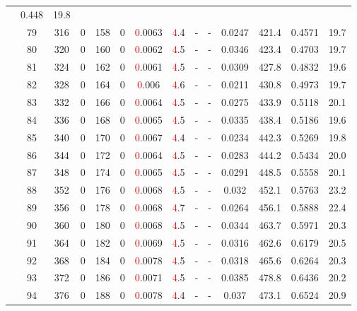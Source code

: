 \begin{table}[htb]
{\begin{tabular}{|c|c|c|c|c|c|c|c|c|c|c|c|c|c|}
 & 0.448 & 19.8
 \\
 & 
79 & 316 & 0 & 158 & 0
 & \textcolor{red}0.0063 & \textcolor{red}4.4
 & - & -
 & 0.0247 & 421.4
 & 0.4571 & 19.7
 \\
 & 
80 & 320 & 0 & 160 & 0
 & \textcolor{red}0.0062 & \textcolor{red}4.5
 & - & -
 & 0.0346 & 423.4
 & 0.4703 & 19.7
 \\
 & 
81 & 324 & 0 & 162 & 0
 & \textcolor{red}0.0061 & \textcolor{red}4.5
 & - & -
 & 0.0309 & 427.8
 & 0.4832 & 19.6
 \\
 & 
82 & 328 & 0 & 164 & 0
 & \textcolor{red}0.006 & \textcolor{red}4.6
 & - & -
 & 0.0211 & 430.8
 & 0.4973 & 19.7
 \\
 & 
83 & 332 & 0 & 166 & 0
 & \textcolor{red}0.0064 & \textcolor{red}4.5
 & - & -
 & 0.0275 & 433.9
 & 0.5118 & 20.1
 \\
 & 
84 & 336 & 0 & 168 & 0
 & \textcolor{red}0.0065 & \textcolor{red}4.5
 & - & -
 & 0.0335 & 438.4
 & 0.5186 & 19.6
 \\
 & 
85 & 340 & 0 & 170 & 0
 & \textcolor{red}0.0067 & \textcolor{red}4.4
 & - & -
 & 0.0234 & 442.3
 & 0.5269 & 19.8
 \\
 & 
86 & 344 & 0 & 172 & 0
 & \textcolor{red}0.0064 & \textcolor{red}4.5
 & - & -
 & 0.0283 & 444.2
 & 0.5434 & 20.0
 \\
 & 
87 & 348 & 0 & 174 & 0
 & \textcolor{red}0.0065 & \textcolor{red}4.5
 & - & -
 & 0.0291 & 448.5
 & 0.5558 & 20.1
 \\
 & 
88 & 352 & 0 & 176 & 0
 & \textcolor{red}0.0068 & \textcolor{red}4.5
 & - & -
 & 0.032 & 452.1
 & 0.5763 & 23.2
 \\
 & 
89 & 356 & 0 & 178 & 0
 & \textcolor{red}0.0068 & \textcolor{red}4.7
 & - & -
 & 0.0264 & 456.1
 & 0.5888 & 22.4
 \\
 & 
90 & 360 & 0 & 180 & 0
 & \textcolor{red}0.0068 & \textcolor{red}4.5
 & - & -
 & 0.0344 & 463.7
 & 0.5971 & 20.3
 \\
 & 
91 & 364 & 0 & 182 & 0
 & \textcolor{red}0.0069 & \textcolor{red}4.5
 & - & -
 & 0.0316 & 462.6
 & 0.6179 & 20.5
 \\
 & 
92 & 368 & 0 & 184 & 0
 & \textcolor{red}0.0078 & \textcolor{red}4.5
 & - & -
 & 0.0318 & 465.6
 & 0.6264 & 20.3
 \\
 & 
93 & 372 & 0 & 186 & 0
 & \textcolor{red}0.0071 & \textcolor{red}4.5
 & - & -
 & 0.0385 & 478.8
 & 0.6436 & 20.2
 \\
 & 
94 & 376 & 0 & 188 & 0
 & \textcolor{red}0.0078 & \textcolor{red}4.4
 & - & -
 & 0.037 & 473.1
 & 0.6524 & 20.9
 \\

\end{tabular}}
\end{table}

